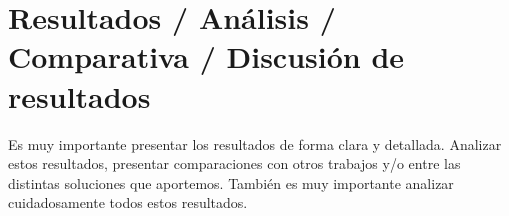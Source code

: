 \chapter{Resultados / Análisis / Comparativa / Discusión de resultados}
Es muy importante presentar los resultados de forma clara y detallada. Analizar estos resultados, presentar comparaciones con otros trabajos y/o entre las distintas soluciones que aportemos. También es muy importante analizar cuidadosamente todos estos resultados.

